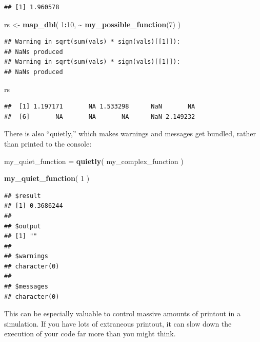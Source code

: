 \documentclass[
]{book}
\newenvironment{Shaded}{\begin{snugshade}}{\end{snugshade}}
\newcommand{\DecValTok}[1]{\textcolor[rgb]{0.00,0.00,0.81}{#1}}
\newcommand{\FunctionTok}[1]{\textcolor[rgb]{0.13,0.29,0.53}{\textbf{#1}}}
\newcommand{\NormalTok}[1]{#1}
\newcommand{\OtherTok}[1]{\textcolor[rgb]{0.56,0.35,0.01}{#1}}
\newcommand{\SpecialCharTok}[1]{\textcolor[rgb]{0.81,0.36,0.00}{\textbf{#1}}}
\begin{document}
\begin{verbatim}
## [1] 1.960578
\end{verbatim}

\begin{Shaded}
\begin{Highlighting}[]
\NormalTok{rs }\OtherTok{\textless{}{-}} \FunctionTok{map\_dbl}\NormalTok{( }\DecValTok{1}\SpecialCharTok{:}\DecValTok{10}\NormalTok{, }\SpecialCharTok{\textasciitilde{}} \FunctionTok{my\_possible\_function}\NormalTok{(}\DecValTok{7}\NormalTok{) )}
\end{Highlighting}
\end{Shaded}

\begin{verbatim}
## Warning in sqrt(sum(vals) * sign(vals)[[1]]):
## NaNs produced
## Warning in sqrt(sum(vals) * sign(vals)[[1]]):
## NaNs produced
\end{verbatim}

\begin{Shaded}
\begin{Highlighting}[]
\NormalTok{rs}
\end{Highlighting}
\end{Shaded}

\begin{verbatim}
##  [1] 1.197171       NA 1.533298      NaN       NA
##  [6]       NA       NA       NA      NaN 2.149232
\end{verbatim}

There is also ``quietly,'' which makes warnings and messages get bundled, rather than printed to the console:

\begin{Shaded}
\begin{Highlighting}[]
\NormalTok{my\_quiet\_function }\OtherTok{=} \FunctionTok{quietly}\NormalTok{( my\_complex\_function )}

\FunctionTok{my\_quiet\_function}\NormalTok{( }\DecValTok{1}\NormalTok{ )}
\end{Highlighting}
\end{Shaded}

\begin{verbatim}
## $result
## [1] 0.3686244
## 
## $output
## [1] ""
## 
## $warnings
## character(0)
## 
## $messages
## character(0)
\end{verbatim}

This can be especially valuable to control massive amounts of printout in a simulation. If you have lots of extraneous printout, it can slow down the execution of your code far more than you might think.
\end{document}
